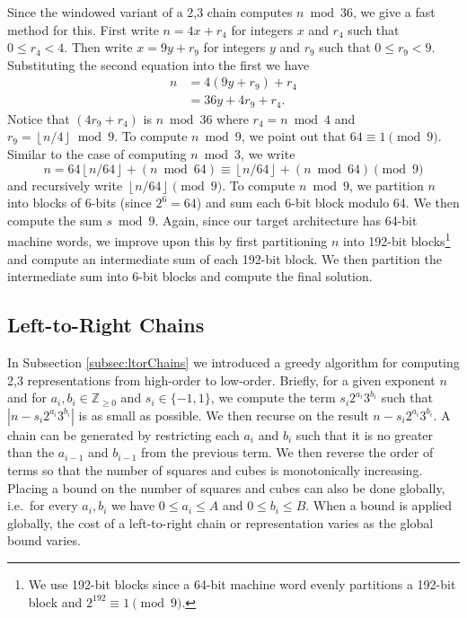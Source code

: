 \documentclass{ucalgthes1}
\theoremstyle{definition}
\newcommand{\ZZgez}{\mathbb{Z}_{\ge 0}}
\newcommand{\floor}[1]{\left\lfloor #1 \right\rfloor}
\begin{document}
Since the windowed variant of a 2,3 chain computes $n \bmod 36$, we give a fast method for this.  First write $n = 4x + r_4$ for integers $x$ and $r_4$ such that $0 \le r_4 < 4$.  Then write $x = 9y + r_9$ for integers $y$ and $r_9$ such that $0 \le r_9 < 9$.  Substituting the second equation into the first we have
\begin{align*}
	n &= 4(9y + r_9) + r_4 \\
	  &= 36y + 4r_9 + r_4.
\end{align*}
Notice that $(4r_9 + r_4)$ is $n \bmod {36}$ where $r_4 = n \bmod 4$ and $r_9 = \floor{n/4} \bmod 9$. To compute $n \bmod 9$, we point out that $64 \equiv 1 \pmod 9$.  Similar to the case of computing $n \bmod 3$, we write
\[
	n = 64 \floor{n/64} + (n \bmod 64) \equiv \floor{n/64} + (n \bmod 64) \pmod 9
\]
and recursively write $\floor{n/64} \pmod 9$.  To compute $n \bmod 9$, we partition $n$ into blocks of 6-bits (since $2^6 = 64$) and sum each 6-bit block modulo 64.  We then compute the sum $s \bmod 9$.  Again, since our target architecture has 64-bit machine words, we improve upon this by first partitioning $n$ into 192-bit blocks\footnote{We use 192-bit blocks since a 64-bit machine word evenly partitions a 192-bit block and $2^{192} \equiv 1 \pmod 9$.} and compute an intermediate sum of each 192-bit block.  We then partition the intermediate sum into 6-bit blocks and compute the final solution.



\subsection{Left-to-Right Chains}

In Subsection \ref{subsec:ltorChains} we introduced a greedy algorithm for computing 2,3 representations from high-order to low-order.  Briefly, for a given exponent $n$ and for $a_i, b_i \in \ZZgez$ and \mbox{$s_i \in \{-1, 1\}$}, we compute the term $s_i2^{a_i}3^{b_i}$ such that $\left|n-s_i2^{a_i}3^{b_i}\right|$ is as small as possible.  We then recurse on the result $n - s_i2^{a_i}3^{b_i}$.  A chain can be generated by restricting each $a_i$ and $b_i$ such that it is no greater than the $a_{i-1}$ and $b_{i-1}$ from the previous term.  We then reverse the order of terms so that the number of squares and cubes is monotonically increasing. Placing a bound on the number of squares and cubes can also be done globally, i.e.\ for every $a_i, b_i$ we have $0 \le a_i \le A$ and $0 \le b_i \le B$. When a bound is applied globally, the cost of a left-to-right chain or representation varies as the global bound varies.
\end{document}
